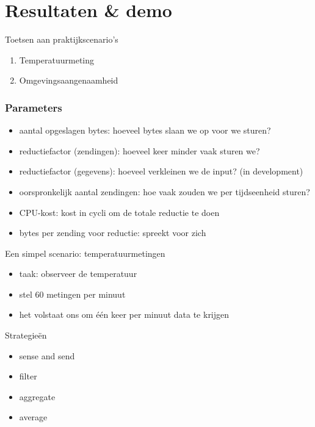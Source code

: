 \documentclass[presentation, bigger]{beamer}
\begin{document}
\section{Resultaten \& demo}
\begin{frame}{Toetsen aan praktijkscenario's}

  \begin{enumerate}
  \item Temperatuurmeting
  \item Omgevingsaangenaamheid
  \end{enumerate}
\end{frame}

\begin{frame}
  \frametitle{Parameters}
  \begin{itemize}
  \item aantal opgeslagen bytes: hoeveel bytes slaan we op voor we sturen?
  \item reductiefactor (zendingen): hoeveel keer minder vaak sturen we?
  \item reductiefactor (gegevens): hoeveel verkleinen we de input? (in development)
  \item oorspronkelijk aantal zendingen: hoe vaak zouden we per tijdseenheid sturen?
  \item CPU-kost: kost in cycli om de totale reductie te doen
  \item bytes per zending voor reductie: spreekt voor zich
  \end{itemize}
\end{frame}

\begin{frame}{Een simpel scenario: temperatuurmetingen}
  \begin{itemize}
  \item taak: observeer de temperatuur
  \item stel 60 metingen per minuut
  \item het volstaat ons om \'e\'en keer per minuut data te krijgen
  \end{itemize}
\end{frame}

\begin{frame}{Strategie\"en}
  \begin{itemize}
  \item sense and send
  \item filter
  \item aggregate
  \item average
  \end{itemize}
\end{frame}
\end{document}
